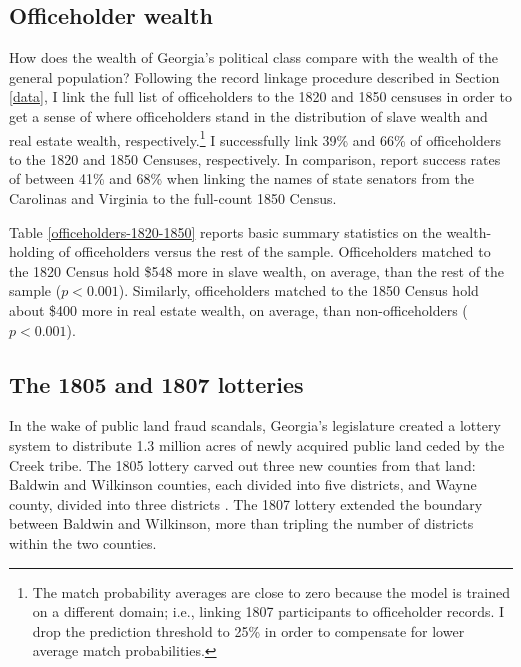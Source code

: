 \subsection{Officeholder wealth}\label{political-class} 

How does the wealth of Georgia's political class compare with the wealth of the general population?  Following the record linkage procedure described in Section \ref{data}, I link the full list of officeholders to the 1820 and 1850 censuses in order to get a sense of where officeholders stand in the distribution of slave wealth and real estate wealth, respectively.\footnote{The match probability averages are close to zero because the model is trained on a different domain; i.e., linking 1807 participants to officeholder records. I drop the prediction threshold to 25\% in order to compensate for lower average match probabilities.} I successfully link 39\% and 66\% of officeholders to the 1820 and 1850 Censuses, respectively. In comparison, \citet{corvalan2018political} report success rates of between 41\% and 68\% when linking the names of state senators from the Carolinas and Virginia to the full-count 1850 Census. 

Table \ref{officeholders-1820-1850} reports basic summary statistics on the wealth-holding of officeholders versus the rest of the sample. Officeholders matched to the 1820 Census hold \$548 more in slave wealth, on average, than the rest of the sample ($p < 0.001$). Similarly, officeholders matched to the 1850 Census hold about \$400 more in real estate wealth, on average, than non-officeholders ($p < 0.001$).

\subsection{The 1805 and 1807 lotteries} \label{lotteries} 

In the wake of public land fraud scandals, Georgia's legislature created a lottery system to distribute 1.3 million acres of newly acquired public land ceded by the Creek tribe. The 1805 lottery carved out three new counties from that land: Baldwin and Wilkinson counties, each divided into five districts, and Wayne county, divided into three districts \citep{clayton1812}. The 1807 lottery extended the boundary between Baldwin and Wilkinson, more than tripling the number of districts within the two counties.  

